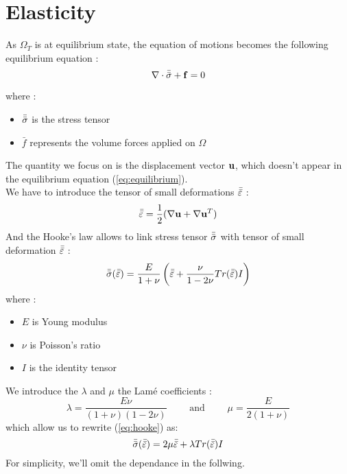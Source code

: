 \section{Elasticity}

As $\Omega_T$ is at equilibrium state, the equation of motions becomes the
following equilibrium equation :
\begin{equation}
  \label{eq:equilibrium}
  \nabla\cdot\bar{\bar{\sigma}} + \mathbf{f} = 0
\end{equation}

where :
\begin{itemize}
  \item $\bar{\bar{\sigma}}$ is the stress tensor
  \item $\bar{f}$ represents the volume forces applied on $\Omega$
\end{itemize}

The quantity we focus on is the displacement vector $\mathbf{u}$, which doesn't appear
in the equilibrium equation (\ref{eq:equilibrium}). \\
We have to introduce the tensor of small deformations $\bar{\bar{\varepsilon}}$ :
\begin{equation}
\label{eq:small-deformation}
\bar{\bar{\varepsilon}} = \frac{1}{2}(\nabla \mathbf{u} + \nabla \mathbf{u}^T)
\end{equation}
And the Hooke's law allows to link stress tensor $\bar{\bar{\sigma}}$ with tensor of
small deformation $\bar{\bar{\varepsilon}}$ :
\begin{equation}
  \label{eq:hooke}
  \bar{\bar{\sigma}}(\bar{\bar{\varepsilon}}) = \frac{E}{1+\nu} \left(\bar{\bar{\varepsilon}}
  + \frac{\nu}{1-2\nu} Tr(\bar{\bar{\varepsilon}}) I \right)
\end{equation}
where :
\begin{itemize}
 \item $E$ is Young modulus
 \item $\nu$ is Poisson's ratio
 \item $I$ is the identity tensor
\end{itemize}
We introduce the $\lambda$ and $\mu$ the Lamé coefficients :
\begin{equation*}
  \lambda=\frac{E\nu}{(1+\nu)(1-2\nu)}
  \quad\quad\text{ and }\quad\quad
  \mu=\frac{E}{2(1+\nu)}
\end{equation*}
which allow us to rewrite (\ref{eq:hooke}) as:
\begin{equation*}
  \bar{\bar{\sigma}}(\bar{\bar{\varepsilon}})
  = 2\mu\bar{\bar{\varepsilon}} + \lambda Tr(\bar{\bar{\varepsilon}})I
\end{equation*}
For simplicity, we'll omit the dependance in the follwing.\\

